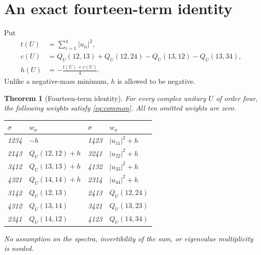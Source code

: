 \documentclass[11pt,a4paper]{article}
\newtheorem{theorem}{Theorem}[section]
\begin{document}
\section{An exact fourteen-term identity}
Put
\begin{align}
t(U)&=\sum_{i=1}^4|u_{ii}|^2,\label{eq:t}\\
c(U)&=Q_U(12,13)+Q_U(12,24)-Q_U(13,12)-Q_U(13,34),\label{eq:c}\\
h(U)&=-\frac{t(U)+c(U)}4.\label{eq:h}
\end{align}
Unlike a negative-mass minimum, $h$ is allowed to be negative.

\begin{theorem}[Fourteen-term identity]\label{thm:14}
For every complex unitary $U$ of order four, the following weights satisfy \eqref{eq:common}. All ten omitted weights are zero.
\begin{center}
\begin{tabular}{ll@{\qquad}ll}
\toprule
$\sigma$ & $w_\sigma$ & $\sigma$ & $w_\sigma$\\
\midrule
1234 & $-h$ & 1423 & $|u_{11}|^2+h$\\
2143 & $Q_U(12,12)+h$ & 3241 & $|u_{22}|^2+h$\\
3412 & $Q_U(13,13)+h$ & 4132 & $|u_{33}|^2+h$\\
4321 & $Q_U(14,14)+h$ & 2314 & $|u_{44}|^2+h$\\
3142 & $Q_U(12,13)$ & 2413 & $Q_U(12,24)$\\
4312 & $Q_U(13,14)$ & 3421 & $Q_U(13,23)$\\
2341 & $Q_U(14,12)$ & 4123 & $Q_U(14,34)$\\
\bottomrule
\end{tabular}
\end{center}
No assumption on the spectra, invertibility of the sum, or eigenvalue multiplicity is needed.
\end{theorem}
\end{document}
